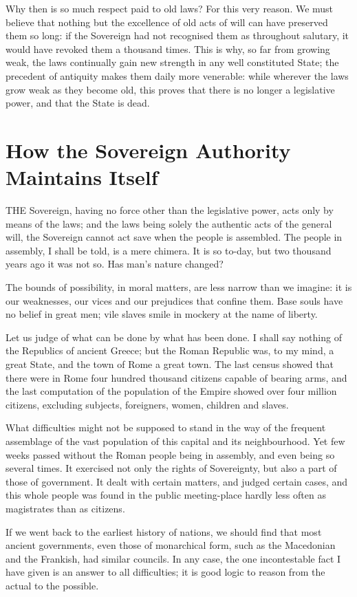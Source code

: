 \documentclass[12pt]{report}
\begin{document}
Why then is so much respect paid to old laws? For this very reason. We must believe that nothing but the excellence of old acts of will can have preserved them so long: if the Sovereign had not recognised them as throughout salutary, it would have revoked them a thousand times. This is why, so far from growing weak, the laws continually gain new strength in any well constituted State; the precedent of antiquity makes them daily more venerable: while wherever the laws grow weak as they become old, this proves that there is no longer a legislative power, and that the State is dead.

\section{How the Sovereign Authority Maintains Itself}
THE Sovereign, having no force other than the legislative power, acts only by means of the laws; and the laws being solely the authentic acts of the general will, the Sovereign cannot act save when the people is assembled. The people in assembly, I shall be told, is a mere chimera. It is so to-day, but two thousand years ago it was not so. Has man's nature changed?

The bounds of possibility, in moral matters, are less narrow than we imagine: it is our weaknesses, our vices and our prejudices that confine them. Base souls have no belief in great men; vile slaves smile in mockery at the name of liberty.

Let us judge of what can be done by what has been done. I shall say nothing of the Republics of ancient Greece; but the Roman Republic was, to my mind, a great State, and the town of Rome a great town. The last census showed that there were in Rome four hundred thousand citizens capable of bearing arms, and the last computation of the population of the Empire showed over four million citizens, excluding subjects, foreigners, women, children and slaves.

What difficulties might not be supposed to stand in the way of the frequent assemblage of the vast population of this capital and its neighbourhood. Yet few weeks passed without the Roman people being in assembly, and even being so several times. It exercised not only the rights of Sovereignty, but also a part of those of government. It dealt with certain matters, and judged certain cases, and this whole people was found in the public meeting-place hardly less often as magistrates than as citizens.

If we went back to the earliest history of nations, we should find that most ancient governments, even those of monarchical form, such as the Macedonian and the Frankish, had similar councils. In any case, the one incontestable fact I have given is an answer to all difficulties; it is good logic to reason from the actual to the possible.
\end{document}
